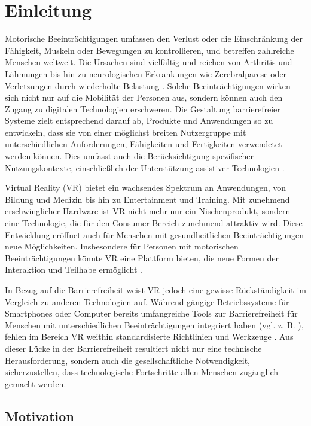 \chapter{Einleitung}

Motorische Beeinträchtigungen umfassen den Verlust oder die Einschränkung der Fähigkeit, Muskeln oder Bewegungen zu kontrollieren, und betreffen zahlreiche Menschen weltweit. Die Ursachen sind vielfältig und reichen von Arthritis und Lähmungen bis hin zu neurologischen Erkrankungen wie Zerebralparese oder Verletzungen durch wiederholte Belastung \citep{yuan_game_2011}. Solche Beeinträchtigungen wirken sich nicht nur auf die Mobilität der Personen aus, sondern können auch den Zugang zu digitalen Technologien erschweren. Die Gestaltung barrierefreier Systeme zielt entsprechend darauf ab, Produkte und Anwendungen so zu entwickeln, dass sie von einer möglichst breiten Nutzergruppe mit unterschiedlichen Anforderungen, Fähigkeiten und Fertigkeiten verwendetet werden können. Dies umfasst auch die Berücksichtigung spezifischer Nutzungskontexte, einschließlich der Unterstützung assistiver Technologien \citep{DINISO9241}. 

Virtual Reality (VR) bietet ein wachsendes Spektrum an Anwendungen, von Bildung und Medizin bis hin zu Entertainment und Training. Mit zunehmend erschwinglicher Hardware ist VR nicht mehr nur ein Nischenprodukt, sondern eine Technologie, die für den Consumer-Bereich zunehmend attraktiv wird. Diese Entwicklung eröffnet auch für Menschen mit gesundheitlichen Beeinträchtigungen neue Möglichkeiten. Insbesondere für Personen mit motorischen Beeinträchtigungen könnte VR eine Plattform bieten, die neue Formen der Interaktion und Teilhabe ermöglicht \citep{mott_i_2020}.

In Bezug auf die Barrierefreiheit weist VR jedoch eine gewisse Rückständigkeit im Vergleich zu anderen Technologien auf. Während gängige Betriebssysteme für Smartphones oder Computer bereits umfangreiche Tools zur Barrierefreiheit für Menschen mit unterschiedlichen Beeinträchtigungen integriert haben (vgl. z. B. \citep{apple_einfuhrung_2024}), fehlen im Bereich VR weithin standardisierte Richtlinien und Werkzeuge \citep{ciccone_next_2023}. Aus dieser Lücke in der Barrierefreiheit resultiert nicht nur eine technische Herausforderung, sondern auch die gesellschaftliche Notwendigkeit, sicherzustellen, dass technologische Fortschritte allen Menschen zugänglich gemacht werden.

\section{Motivation}

